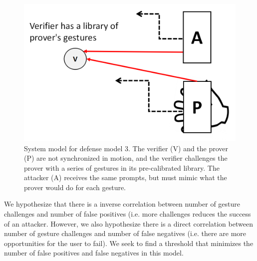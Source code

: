 \begin{itemize}
\begin{figure}[!tb]
\centering
\includegraphics[width=0.65 \linewidth]{./figures/model3.png}
\caption{System model for defense model 3. The verifier (V) and the prover (P) are not synchronized in motion, and the verifier challenges the prover with a series of gestures in its pre-calibrated library. The attacker (A) receives the same prompts, but must mimic what the prover would do for each gesture.}
\label{fig:Model3}
\end{figure}

We hypothesize that there is a inverse correlation between number of gesture challenges and number of false positives (i.e. more challenges reduces the success of an attacker. However, we also hypothesize there is a direct correlation between number of gesture challenges and number of false negatives (i.e. there are more opportunities for the user to fail). We seek to find a threshold that minimizes the number of false positives and false negatives in this model.

\end{itemize}

